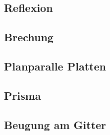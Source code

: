 \subsection{Reflexion}
\label{sec:reflexionauswertung}
\subsection{Brechung}
\label{sec:brechungauswertung}
\subsection{Planparalle Platten}
\label{sec:planplatteauswertung}
\subsection{Prisma}
\label{sec:prismaauswertung}
\subsection{Beugung am Gitter}
\label{sec:beugungauswertung}
